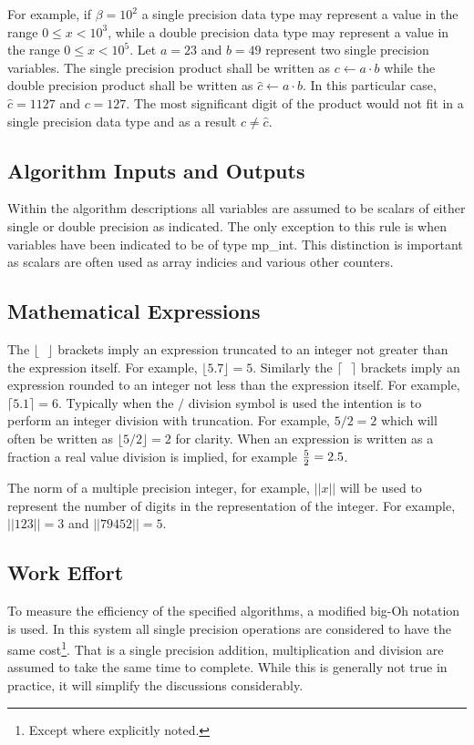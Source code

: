 \documentclass[b5paper]{book}
\begin{document}
For example, if $\beta = 10^2$ a single precision data type may represent a value in the 
range $0 \le x < 10^3$, while a double precision data type may represent a value in the range $0 \le x < 10^5$.  Let
$a = 23$ and $b = 49$ represent two single precision variables.  The single precision product shall be written
as $c \leftarrow a \cdot b$ while the double precision product shall be written as $\hat c \leftarrow a \cdot b$.
In this particular case, $\hat c = 1127$ and $c = 127$.  The most significant digit of the product would not fit 
in a single precision data type and as a result $c \ne \hat c$.  

\subsection{Algorithm Inputs and Outputs}
Within the algorithm descriptions all variables are assumed to be scalars of either single or double precision
as indicated.  The only exception to this rule is when variables have been indicated to be of type mp\_int.  This 
distinction is important as scalars are often used as array indicies and various other counters.  

\subsection{Mathematical Expressions}
The $\lfloor \mbox{ } \rfloor$ brackets imply an expression truncated to an integer not greater than the expression 
itself.  For example, $\lfloor 5.7 \rfloor = 5$.  Similarly the $\lceil \mbox{ } \rceil$ brackets imply an expression
rounded to an integer not less than the expression itself.  For example, $\lceil 5.1 \rceil = 6$.  Typically when 
the $/$ division symbol is used the intention is to perform an integer division with truncation.  For example, 
$5/2 = 2$ which will often be written as $\lfloor 5/2 \rfloor = 2$ for clarity.  When an expression is written as a 
fraction a real value division is implied, for example ${5 \over 2} = 2.5$.  

The norm of a multiple precision integer, for example, $\vert \vert x \vert \vert$ will be used to represent the number of digits in the representation
of the integer.  For example, $\vert \vert 123 \vert \vert = 3$ and $\vert \vert 79452 \vert \vert = 5$.  

\subsection{Work Effort}
To measure the efficiency of the specified algorithms, a modified big-Oh notation is used.  In this system all 
single precision operations are considered to have the same cost\footnote{Except where explicitly noted.}.  
That is a single precision addition, multiplication and division are assumed to take the same time to 
complete.  While this is generally not true in practice, it will simplify the discussions considerably.
\end{document}

